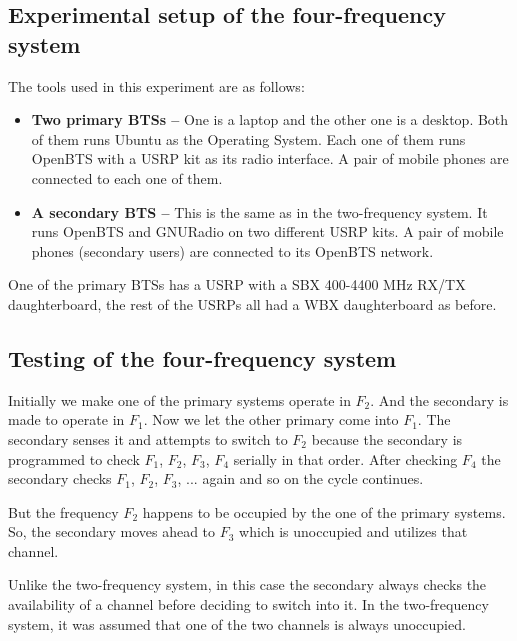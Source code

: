 \subsection{Experimental setup of the four-frequency system}
The tools used in this experiment are as follows:
\begin{itemize}
    \item \textbf{Two primary BTSs --} One is a laptop and the other one is a
    desktop. Both of them runs Ubuntu as the Operating System. Each one of
    them runs OpenBTS with a USRP kit as its radio interface. A pair of mobile
    phones are connected to each one of them.
    \item \textbf{A secondary BTS --} This is the same as in the 
    two-frequency system. It runs OpenBTS and GNURadio on two different USRP
    kits. A pair of mobile phones (secondary users) are connected to its
    OpenBTS network.
\end{itemize}

One of the primary BTSs has a USRP with a SBX 400-4400 MHz RX/TX 
daughterboard, the rest of the USRPs all had a WBX daughterboard as before.

\subsection{Testing of the four-frequency system}

Initially we make one of the primary systems operate in $F_2$. And the 
secondary is made to operate in $F_1$. Now we let the other primary come into 
$F_1$. The secondary senses it and attempts to switch to $F_2$ because the 
secondary is programmed to check $F_1$, $F_2$, $F_3$, $F_4$ serially in that 
order. After checking $F_4$ the secondary checks $F_1$, $F_2$, $F_3$, ... 
again and so on the cycle continues.

But the frequency $F_2$ happens to be occupied by the one of the primary 
systems. So, the secondary moves ahead to $F_3$ which is unoccupied and 
utilizes that channel.

Unlike the two-frequency system, in this case the secondary always checks 
the availability of a channel before deciding to switch into it. In the 
two-frequency system, it was assumed that one of the two channels is always
unoccupied.

